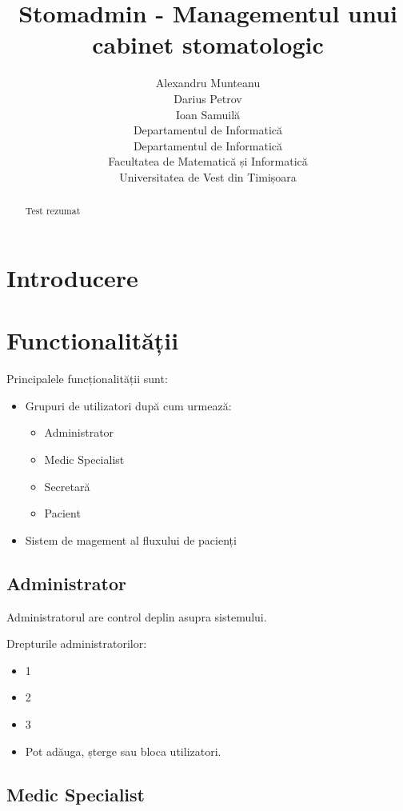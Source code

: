 \documentclass[a4paper,12pt]{article}
\title{Stomadmin - Managementul unui cabinet stomatologic}
\author{Alexandru Munteanu\\
Darius Petrov\\
Ioan Samuilă\\
Departamentul de Informatică\\
Departamentul de Informatică\\
Facultatea de Matematică și Informatică\\
Universitatea de Vest din Timișoara}
\begin{document}
\maketitle
\begin{abstract}
Test rezumat
\end{abstract}

\pagebreak

\tableofcontents

\pagebreak

\section{Introducere}



\section{Functionalității}

Principalele funcționalității sunt:
\begin{itemize}
\item Grupuri de utilizatori după cum urmează:
\begin{itemize}
\item Administrator
\item Medic Specialist
\item Secretară
\item Pacient
\end{itemize}
\item Sistem de magement al fluxului de pacienți
\end{itemize}

\subsection{Administrator}

Administratorul are control deplin asupra sistemului.

Drepturile administratorilor:

\begin{itemize}
\item 1
\item 2
\item 3
\item Pot adăuga, șterge sau bloca utilizatori.
\end{itemize}

\subsection{Medic Specialist}
\end{document}
